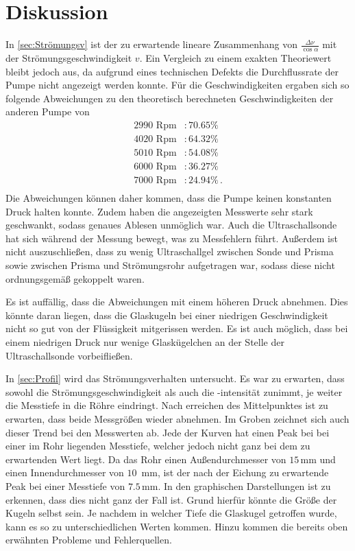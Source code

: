 \section{Diskussion}
\label{sec:Diskussion}

In \autoref{sec:Strömungsv} ist der zu erwartende lineare Zusammenhang von $\frac{\Delta \nu}{\cos \alpha}$ mit der Strömungsgeschwindigkeit $v$. Ein Vergleich zu einem exakten Theoriewert bleibt jedoch aus, 
da aufgrund eines technischen Defekts die Durchflussrate der Pumpe nicht angezeigt werden konnte. Für die Geschwindigkeiten ergaben sich so folgende Abweichungen zu den theoretisch berechneten 
Geschwindigkeiten der anderen Pumpe von
\begin{align*}
    2990 \text{ Rpm}&:70.65\%\\
    4020 \text{ Rpm}&:64.32\%\\
    5010 \text{ Rpm}&:54.08\%\\
    6000 \text{ Rpm}&:36.27\%\\
    7000 \text{ Rpm}&:24.94\%\, .\\
\end{align*}
Die Abweichungen können daher kommen, dass die Pumpe keinen konstanten Druck halten konnte. Zudem haben die angezeigten Messwerte sehr stark geschwankt,
sodass genaues Ablesen unmöglich war. Auch die Ultraschallsonde hat sich während der Messung bewegt, was zu Messfehlern führt. Außerdem ist nicht 
auszuschließen, dass zu wenig Ultraschallgel zwischen Sonde und Prisma sowie zwischen Prisma und Strömungsrohr aufgetragen war, sodass diese nicht ordnungsgemäß gekoppelt
waren. 

Es ist auffällig, dass die Abweichungen mit einem höheren Druck abnehmen. Dies könnte daran liegen, dass die Glaskugeln bei einer niedrigen Geschwindigkeit
nicht so gut von der Flüssigkeit mitgerissen werden. Es ist auch möglich, dass bei einem niedrigen Druck nur wenige Glaskügelchen an der Stelle der 
Ultraschallsonde vorbeifließen.

In \autoref{sec:Profil} wird das Strömungsverhalten untersucht. Es war zu erwarten, dass sowohl die Strömungsgeschwindigkeit als auch die -intensität zunimmt, je weiter die Messtiefe in die Röhre eindringt.
Nach erreichen des Mittelpunktes ist zu erwarten, dass beide Messgrößen wieder abnehmen. Im Groben zeichnet sich auch dieser Trend bei den Messwerten ab. Jede der Kurven hat einen Peak bei bei einer im Rohr liegenden Messtiefe, welcher jedoch nicht ganz bei dem zu erwartenden Wert liegt.
Da das Rohr einen Außendurchmesser von $15\,$mm und einen Innendurchmesser von $10\,$ mm, ist der nach der Eichung zu erwartende Peak bei einer Messtiefe von $7.5\,$mm.
In den graphischen Darstellungen ist zu erkennen, dass dies nicht ganz der Fall ist. Grund hierfür könnte die Größe der Kugeln selbst sein. Je nachdem in welcher Tiefe die Glaskugel getroffen wurde, kann es so zu unterschiedlichen Werten kommen. 
Hinzu kommen die bereits oben erwähnten Probleme und Fehlerquellen.
